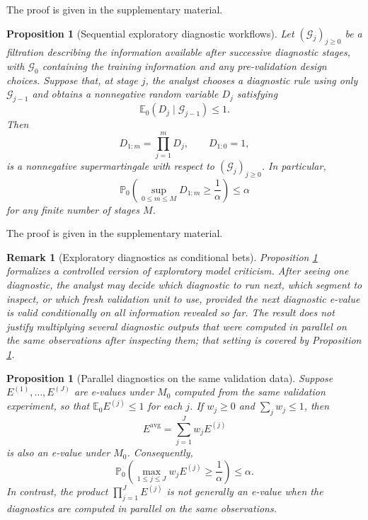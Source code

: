 \documentclass[pdflatex,sn-basic]{sn-jnl}
\theoremstyle{thmstyleone}
\newtheorem{proposition}[theorem]{Proposition}
\theoremstyle{thmstyletwo}
\newtheorem{remark}{Remark}
\theoremstyle{thmstylethree}
\newcommand{\E}{\mathbb E}
\newcommand{\Pbb}{\mathbb P}
\newcommand{\1}{\mathbf 1}
\newcommand{\calG}{\mathcal G}
\begin{document}
\noindent The proof is given in the supplementary material.

\begin{proposition}[Sequential exploratory diagnostic workflows]
\label{prop:sequential_workflow}
Let $(\calG_j)_{j\geq0}$ be a filtration describing the information available after successive diagnostic stages, with $\calG_0$ containing the training information and any pre-validation design choices. Suppose that, at stage $j$, the analyst chooses a diagnostic rule using only $\calG_{j-1}$ and obtains a nonnegative random variable $D_j$ satisfying
\begin{equation}
 \E_0(D_j\mid\calG_{j-1})\leq1.
\end{equation}
Then
\begin{equation}
 D_{1:m}=\prod_{j=1}^m D_j,\qquad D_{1:0}=1,
\end{equation}
is a nonnegative supermartingale with respect to $(\calG_j)_{j\geq0}$. In particular,
\begin{equation}
 \Pbb_0\left(\sup_{0\leq m\leq M}D_{1:m}\geq\frac{1}{\alpha}\right)\leq\alpha
\end{equation}
for any finite number of stages $M$.
\end{proposition}

\noindent The proof is given in the supplementary material.

\begin{remark}[Exploratory diagnostics as conditional bets]
Proposition \ref{prop:sequential_workflow} formalizes a controlled version of exploratory model criticism. After seeing one diagnostic, the analyst may decide which diagnostic to run next, which segment to inspect, or which fresh validation unit to use, provided the next diagnostic e-value is valid conditionally on all information revealed so far. The result does not justify multiplying several diagnostic outputs that were computed in parallel on the same observations after inspecting them; that setting is covered by Proposition \ref{prop:parallel}.
\end{remark}

\begin{proposition}[Parallel diagnostics on the same validation data]
\label{prop:parallel}
Suppose $E^{(1)},\ldots,E^{(J)}$ are e-values under $M_0$ computed from the same validation experiment, so that $\E_0E^{(j)}\leq1$ for each $j$. If $w_j\geq0$ and $\sum_jw_j\leq1$, then
\begin{equation}
 E^{\mathrm{avg}}=\sum_{j=1}^Jw_jE^{(j)}
\end{equation}
is also an e-value under $M_0$. Consequently,
\begin{equation}
 \Pbb_0\left(\max_{1\leq j\leq J}w_jE^{(j)}\geq \frac{1}{\alpha}\right)\leq\alpha.
\end{equation}
In contrast, the product $\prod_{j=1}^JE^{(j)}$ is not generally an e-value when the diagnostics are computed in parallel on the same observations.
\end{proposition}
\end{document}
